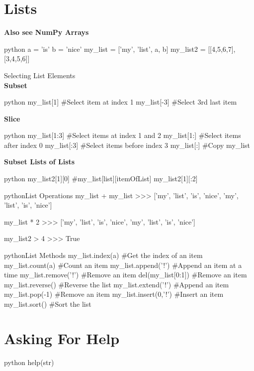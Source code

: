 \section{Lists}

\begin{textbox}{}
\textbf{Also see NumPy Arrays}
\end{textbox}

\begin{codebox}{python}{}
a = 'is'
b = 'nice'
my_list = ['my', 'list', a, b]
my_list2 = [[4,5,6,7], [3,4,5,6]]
\end{codebox}

\begin{myblock}{Selecting List Elements}
\\
\textbf{Subset}
\begin{codebox}{python}{}
my_list[1]  #Select item at index 1
my_list[-3]  #Select 3rd last item
\end{codebox}

\textbf{Slice}
\begin{codebox}{python}{}
my_list[1:3]  #Select items at index 1 and 2
my_list[1:]  #Select items after index 0
my_list[:3]  #Select items before index 3
my_list[:]  #Copy my_list
\end{codebox}

\textbf{Subset Lists of Lists}
\begin{codebox}{python}{}
my_list2[1][0]  #my_list[list][itemOfList]
my_list2[1][:2]
\end{codebox}

\end{myblock}

\begin{codebox}{python}{List Operations}
my_list + my_list
>>> ['my', 'list', 'is', 'nice', 'my', 'list', 'is', 'nice']

my_list * 2
>>> ['my', 'list', 'is', 'nice', 'my', 'list', 'is', 'nice']

my_list2 > 4
>>> True
\end{codebox}

\begin{codebox}{python}{List Methods}
my_list.index(a)  #Get the index of an item
my_list.count(a)  #Count an item
my_list.append('!')  #Append an item at a time
my_list.remove('!')  #Remove an item
del(my_list[0:1])  #Remove an item
my_list.reverse()  #Reverse the list
my_list.extend('!')  #Append an item
my_list.pop(-1)  #Remove an item
my_list.insert(0,'!')  #Insert an item
my_list.sort()  #Sort the list
\end{codebox}


\section{Asking For Help}

\begin{codebox}{python}{}
help(str)
\end{codebox}
